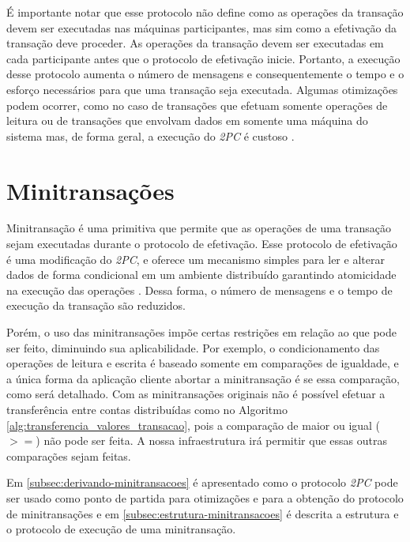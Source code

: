 \documentclass[11pt,twoside,a4paper]{book}
\begin{document}
É importante notar que esse protocolo não define como as operações da transação devem ser executadas nas máquinas participantes, mas sim como a efetivação da transação deve proceder. As operações da transação devem ser executadas em cada participante antes que o protocolo de efetivação inicie. Portanto, a execução desse protocolo aumenta o número de mensagens e consequentemente o tempo e o esforço necessários para que uma transação seja executada. Algumas otimizações podem ocorrer, como no caso de transações que efetuam somente operações de leitura ou de transações que envolvam dados em somente uma máquina do sistema mas, de forma geral, a execução do \emph{2PC} é custoso \cite{gray-lamport}.

\section{Minitransações}
\label{sec:minitransacoes}
Minitransação é uma primitiva que permite que as operações de uma transação sejam executadas durante o protocolo de efetivação. Esse protocolo de efetivação é uma modificação do \emph{2PC}, e oferece um mecanismo simples para ler e alterar dados de forma condicional em um ambiente distribuído garantindo atomicidade na execução das operações \cite{sinfonia}. Dessa forma, o número de mensagens e o tempo de execução da transação são reduzidos. 

Porém, o uso das minitransações impõe certas restrições em relação ao que pode ser feito, diminuindo sua aplicabilidade. Por exemplo, o condicionamento das operações de leitura e escrita é baseado somente em comparações de igualdade, e a única forma da aplicação cliente abortar a minitransação é se essa comparação, como será detalhado. Com as minitransações originais não é possível efetuar a transferência entre contas distribuídas como no Algoritmo \ref{alg:transferencia_valores_transacao}, pois a comparação de maior ou igual ($>=$) não pode ser feita. A nossa infraestrutura irá permitir que essas outras comparações sejam feitas.

Em \ref{subsec:derivando-minitransacoes} é apresentado como o protocolo \emph{2PC} pode ser usado como ponto de partida para otimizações e para a obtenção do protocolo de minitransações e em \ref{subsec:estrutura-minitransacoes} é descrita a estrutura e o protocolo de execução de uma minitransação.
\end{document}
